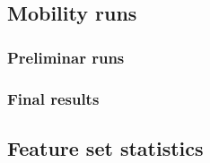 \newpage
\subsection{Mobility runs}
\label{appendix:mobility}

\subsubsection{Preliminar runs}


\subsubsection{Final results}



\newpage
\subsection{Feature set statistics}
\label{appendix:fs}


